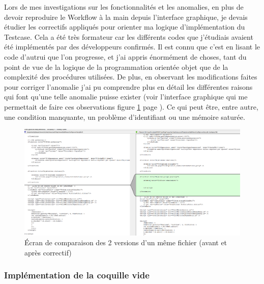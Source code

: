 Lors de mes investigations sur les fonctionnalit\'{e}s et les anomalies, en plus de devoir reproduire le \gls{Workflow} \`{a} la main depuis l'interface graphique, je devais \'{e}tudier les correctifs appliqu\'{e}s pour orienter ma logique d'impl\'{e}mentation du \gls{Testcase}. Cela a \'{e}t\'{e} tr\`{e}s formateur car les diff\'{e}rents codes que j'\'{e}tudiais avaient \'{e}t\'{e} impl\'{e}mentés par des d\'{e}veloppeurs confirm\'{e}s. Il est connu que c'est en lisant le code d'autrui que l'on progresse, et j'ai appris \'{e}norm\'{e}ment de choses, tant du point de vue de la logique de la programmation orient\'{e}e objet que de la complexit\'{e} des proc\'{e}dures utilis\'{e}es. De plus, en observant les modifications faites pour corriger l'anomalie j'ai pu comprendre plus en d\'{e}tail les diff\'{e}rentes raisons qui font qu'une telle anomalie puisse exister (voir l'interface graphique qui me permettait de faire ces observations figure \ref{figure:diffAgainst} page \pageref{figure:diffAgainst}). Ce qui peut \^{e}tre, entre autre, une condition manquante, un probl\`{e}me d'identifiant ou une m\'{e}moire satur\'{e}e.\\


\begin{figure}[!ht]
  \centering
      \includegraphics[width=\textwidth]{images/diffAgainst.png}
  \caption{\'{E}cran de comparaison des 2 versions d'un m\^{e}me fichier (avant et apr\`{e}s correctif)}
	\label{figure:diffAgainst}
\end{figure}




\subsubsection{Impl\'{e}mentation de la coquille vide}

